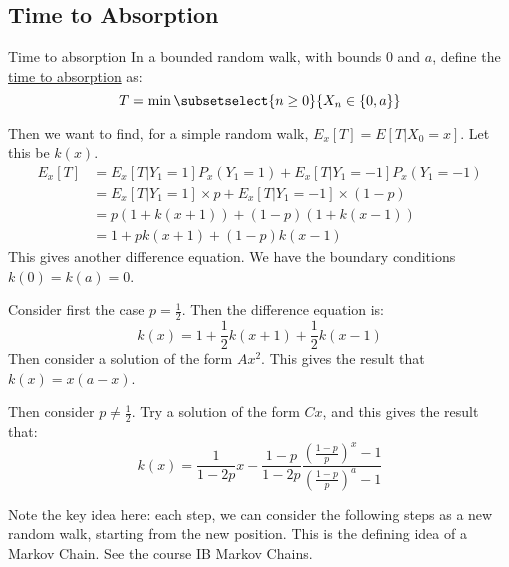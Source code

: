 \documentclass[../Main.tex]{subfiles}
\begin{document}
\subsection{Time to Absorption}
\begin{definition}{Time to absorption}
    In a bounded random walk, with bounds $0$ and $a$, define the \\\underline{time to absorption} as:
    \begin{equation*}
        T = \min{\subsetselect{n \geq 0}{X_n \in \{0, a\}}}
    \end{equation*}
\end{definition}
Then we want to find, for a simple random walk, $E_x[T] = E[T | X_0 = x]$. Let this be $k(x)$.
\begin{align*}
    E_x[T] &= E_x[T | Y_1 = 1]P_x(Y_1 = 1) + E_x[T | Y_1 = -1]P_x(Y_1 = -1) \\
    &= E_x[T | Y_1 = 1] \times p + E_x[T | Y_1 = -1] \times (1-p) \\
    &= p(1 + k(x + 1)) + (1 - p)(1 + k(x - 1)) \\
    &= 1 + pk(x + 1) + (1-p)k(x - 1)
\end{align*}
This gives another difference equation. We have the boundary conditions $k(0) = k(a) = 0$.\par
Consider first the case $p = \frac{1}{2}$. Then the difference equation is:
\begin{equation*}
    k(x) = 1 + \frac{1}{2}k(x + 1) + \frac{1}{2}k(x - 1)
\end{equation*}
Then consider a solution of the form $Ax^2$. This gives the result that $k(x) = x(a - x)$.\par
Then consider $p \neq \frac{1}{2}$. Try a solution of the form $Cx$, and this gives the result that:
\begin{equation*}
    k(x) = \frac{1}{1 - 2p} x - \frac{1 - p}{1 - 2p}\frac{\left(\frac{1-p}{p}\right)^x - 1}{\left(\frac{1-p}{p}\right)^a - 1}
\end{equation*}
\begin{remark}
    Note the key idea here: each step, we can consider the following steps as a new random walk, starting from the new position. This is the defining idea of a Markov Chain. See the course IB Markov Chains.
\end{remark}
\end{document}
